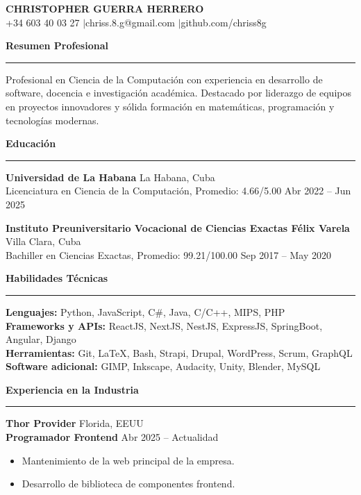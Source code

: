 \documentclass[11pt]{article}
\newcommand{\sectiontitle}[1]{%
	\vspace{30pt}
	{\large \textbf{#1}} \\
	\rule{\linewidth}{0.4pt}

}
\begin{document}
	
	\begin{center}
		{\LARGE \textbf{CHRISTOPHER GUERRA HERRERO}} \\[6pt]
		+34 603 40 03 27 \quad$\vert$\quad chriss.8.g@gmail.com \quad$\vert$\quad github.com/chriss8g \\[6pt]
	
	\end{center}
	
	\sectiontitle{Resumen Profesional}
	\vspace{10pt}

	 Profesional en Ciencia de la Computación con experiencia en desarrollo de software, docencia e investigación académica. Destacado por liderazgo de equipos en proyectos innovadores y sólida formación en matemáticas, programación y tecnologías modernas.
	
	\sectiontitle{Educación}
	\vspace{10pt}
	\textbf{Universidad de La Habana} \hfill La Habana, Cuba \\
	Licenciatura en Ciencia de la Computación, Promedio: 4.66/5.00 \hfill Abr 2022 – Jun 2025
	
	\vspace{10pt}
	\textbf{Instituto Preuniversitario Vocacional de Ciencias Exactas Félix Varela} \hfill Villa Clara, Cuba \\
	Bachiller en Ciencias Exactas, Promedio: 99.21/100.00 \hfill Sep 2017 – May 2020
	
	\sectiontitle{Habilidades Técnicas}
	\vspace{10pt}
	\textbf{Lenguajes:} Python, JavaScript, C\#, Java, C/C++, MIPS, PHP \\
	\textbf{Frameworks y APIs:} ReactJS, NextJS, NestJS, ExpressJS, SpringBoot, Angular, Django \\
	\textbf{Herramientas:} Git, LaTeX, Bash, Strapi, Drupal, WordPress, Scrum, GraphQL \\
	\textbf{Software adicional:} GIMP, Inkscape, Audacity, Unity, Blender, MySQL
	
	\sectiontitle{Experiencia en la Industria}
	\vspace{10pt}
	\textbf{Thor Provider} \hfill Florida, EEUU \\
	\textbf{Programador Frontend} \hfill Abr 2025 – Actualidad
	\begin{itemize}[left=10pt,itemsep=3pt]
		\item Mantenimiento de la web principal de la empresa.
		\item Desarrollo de biblioteca de componentes frontend.
	\end{itemize}
	
\end{document}
